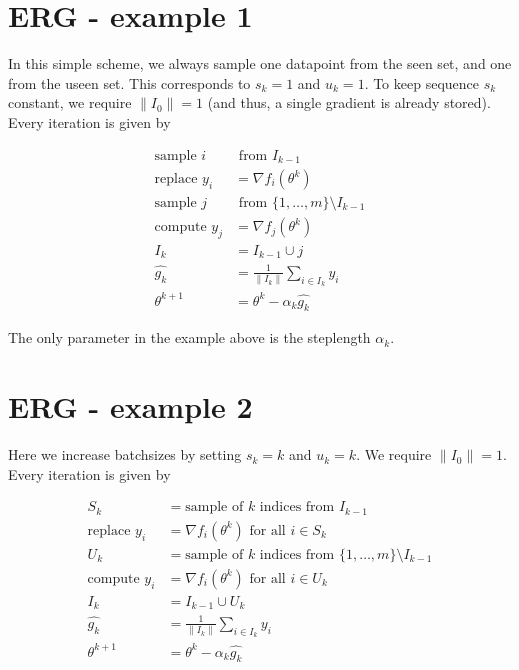 \documentclass[12pt]{article}
\begin{document}
	\section{ERG - example 1 }
	
	In this simple scheme, we always sample one datapoint from the seen set, and one from the useen set. This corresponds to $s_k = 1$ and $u_k=1$. To keep sequence $s_k$ constant, we require $\|I_0\| = 1$ (and thus, a single gradient is already stored). Every iteration is given by 

 	\begin{align*}
   	\mbox{sample } i& \mbox{ from } I_{k-1}  \\
	\mbox{replace } y_i &= \nabla f_i(\theta^k) \\
	\mbox{sample }  j& \mbox{ from }\{1,\ldots,m\} \setminus I_{k-1}\\
	\mbox{compute }  y_j &= \nabla f_j(\theta^k) \\
	I_k &=  I_{k-1} \cup j\\
	\hat{g_k} & = \frac{1}{\| I_k \| } \sum_{i \in I_k} y_i \\ 
   	\theta^{k+1} &= \theta^k - \alpha_k \hat{g_k}
 	\end{align*}
	
	
	  The only parameter in the example above is the steplength $\alpha_k$. 
 
  	\section{ERG - example 2}
	
  	Here we increase batchsizes by setting $s_k = k$ and $u_k=k$. We require $\|I_0\| = 1$. Every iteration is given by 
	
 	\begin{align*}
	S_k &=  \mbox{sample of } k \mbox{ indices from } I_{k-1}\\
	\mbox{replace } y_i &= \nabla f_i(\theta^k) \mbox{ for all } i \in S_k \\
	U_k &=  \mbox{sample of } k \mbox{ indices from } \{1,\ldots,m\} \setminus I_{k-1}\\
	\mbox{compute } y_i &= \nabla f_i(\theta^k) \mbox{ for all } i \in U_k \\
	I_k &=  I_{k-1} \cup U_k\\
	\hat{g_k} & = \frac{1}{\| I_k \| } \sum_{i \in I_k} y_i \\ 
   	\theta^{k+1} &= \theta^k - \alpha_k \hat{g_k}
 	\end{align*}
	
\end{document}
